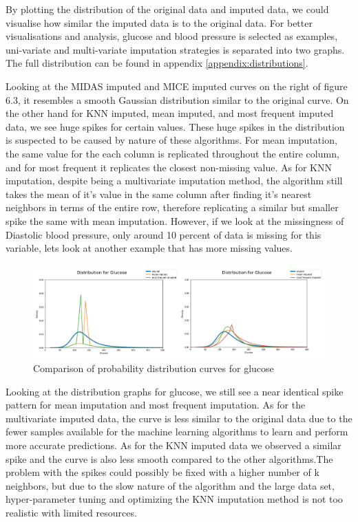\documentclass{l4proj}
\begin{document}
By plotting the distribution of the original data and imputed data, we could visualise how similar the imputed data is to the original data. For better visualisations and analysis, glucose and blood pressure is selected as examples, uni-variate and multi-variate imputation strategies is separated into two graphs. The full distribution can be found in appendix \ref{appendix:distributions}.

Looking at the MIDAS imputed and MICE imputed curves on the right of figure 6.3, it resembles a smooth Gaussian distribution similar to the original curve. On the other hand for KNN imputed, mean imputed, and most frequent imputed data, we see huge spikes for certain values. These huge spikes in the distribution is suspected to be caused by nature of these algorithms. For mean imputation, the same value for the each column is replicated throughout the entire column, and for most frequent it replicates the closest non-missing value. As for KNN imputation, despite being a multivariate imputation method, the algorithm still takes the mean of it's value in the same column after finding it's nearest neighbors in terms of the entire row, therefore replicating a similar but smaller spike the same with mean imputation. However, if we look at the missingness of Diastolic blood pressure, only around 10 percent of data is missing for this variable, lets look at another example that has more missing values.

\begin{figure}[!htb]
  \caption{Comparison of probability distribution curves for glucose}
  \includegraphics[width=\textwidth]{dissertation/Latex/images/Glucose Distribution.PNG}
\end{figure}


Looking at the distribution graphs for glucose, we still see a near identical spike pattern for mean imputation and most frequent imputation. As for the multivariate imputed data, the curve is less similar to the original data due to the fewer samples available for the machine learning algorithms to learn and perform more accurate predictions. As for the KNN imputed data we observed a similar spike and the curve is also less smooth compared to the other algorithms.The problem with the spikes could possibly be fixed with a higher number of k neighbors, but due to the slow nature of the algorithm and the large data set, hyper-parameter tuning and optimizing the KNN imputation method is not too realistic with limited resources.
\end{document}
